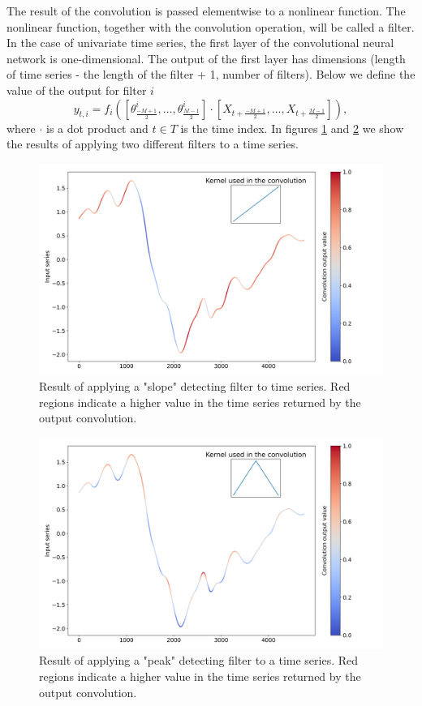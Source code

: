 \documentclass[a4paper,11pt,twoside]{report}
\theoremstyle{definition}
\begin{document}
The result of the convolution is passed elementwise to a nonlinear function. The nonlinear function, together with the convolution operation, will be called a filter.
In the case of univariate time series, the first layer of the convolutional neural network is one-dimensional. The output of the first layer has dimensions (length of time series - the length of the filter + 1, number of filters). Below we define the value of the output for filter $i$
$$ y_{t, i} = f_i([\theta_{\frac{-M+1}{2}}^i, \dots , \theta_{\frac{M-1}{2}}^i] \cdot [X_{t+\frac{-M+1}{2}}, \dots, X_{t+\frac{M-1}{2}}]),$$
where $\cdot$ is a dot product and $t \in T$ is the time index.
In figures \ref{fig:convolution_output_growth} and \ref{fig:convolution_output_hill} we show the results of applying two different filters to a time series.

\FloatBarrier

\begin{figure}[h!t]
\centering
\includegraphics[width=17cm]{imgs/convolution_output_growth.png}
\caption{Result of applying a "slope" detecting filter to time series. Red regions indicate a higher value in the time series returned by the output convolution.}
\label{fig:convolution_output_growth}
\end{figure}
\FloatBarrier
\begin{figure}[h!]
\centering
\includegraphics[width=17cm]{imgs/convolution_output_hills.png}
\caption{Result of applying a "peak" detecting filter to a time series. Red regions indicate a higher value in the time series returned by the output convolution.}
\label{fig:convolution_output_hill}
\end{figure}
\end{document}
